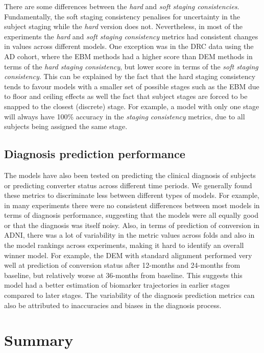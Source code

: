 There are some differences between the \emph{hard} and \emph{soft staging consistencies}. Fundamentally, the soft staging consistency penalises for uncertainty in the subject staging while the \emph{hard} version does not. Nevertheless, in most of the experiments the \emph{hard} and \emph{soft staging consistency} metrics had consistent changes in values across different models. One exception was in the DRC data using the AD cohort, where the EBM methods had a higher score than DEM methods in terms of the \emph{hard staging consistency}, but lower score in terms of the \emph{soft staging consistency}. This can be explained by the fact that the hard staging consistency tends to favour models with a smaller set of possible stages such as the EBM due to floor and ceiling effects as well the fact that subject stages are forced to be snapped to the closest (discrete) stage. For example, a model with only one stage will always have 100\% accuracy in the \emph{staging consistency} metrics, due to all subjects being assigned the same stage. 

\subsection{Diagnosis prediction performance}

The models have also been tested on predicting the clinical diagnosis of subjects or predicting converter status across different time periods. We generally found these metrics to discriminate less between different types of models. For example, in many experiments there were no consistent differences between most models in terms of diagnosis performance, suggesting that the models were all equally good or that the diagnosis was itself noisy. Also, in terms of prediction of conversion in ADNI, there was a lot of variability in the metric values across folds and also in the model rankings across experiments, making it hard to identify an overall winner model. For example, the DEM with standard alignment performed very well at prediction of conversion status after 12-months and 24-months from baseline, but relatively worse at 36-months from baseline. This suggests this model had a better estimation of biomarker trajectories in earlier stages compared to later stages. The variability of the diagnosis prediction metrics can also be attributed to inaccuracies and biases in the diagnosis process.

\section{Summary}

